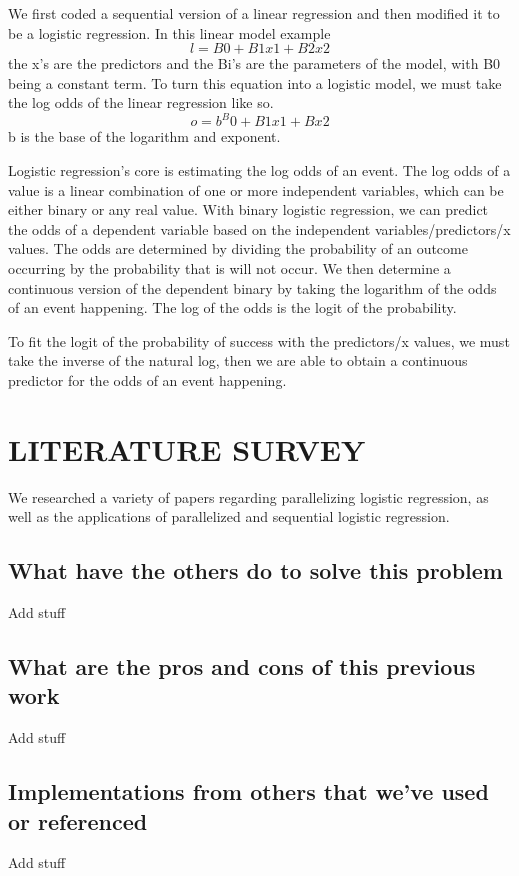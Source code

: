\documentclass[letterpaper, 10 pt, conference]{ieeeconf}  %
\begin{document}
We first coded a sequential version of a linear regression and then modified it to be a logistic regression. In this linear model example
$$l = B0 + B1x1 + B2x2$$
the x’s are the predictors and the Bi’s are the parameters of the model, with B0 being a constant term. To turn this equation into a logistic model, we must take the log odds of the linear regression like so.
$$o = b^ B0 + B1x1 + Bx2$$
b is the base of the logarithm and exponent. 


Logistic regression’s core is estimating the log odds of an event. The log odds of a value is a linear combination of one or more independent variables, which can be either binary or any real value. With binary logistic regression, we can predict the odds of a dependent variable based on the independent variables/predictors/x values. The odds are determined by dividing the probability of an outcome occurring by the probability that is will not occur. We then determine a continuous version of the dependent binary by taking the logarithm of the odds of an event happening. The log of the odds is the logit of the probability.

To fit the logit of the probability of success with the predictors/x values, we must take the inverse of the natural log, then we are able to obtain a continuous predictor for the odds of an event happening. 

\section{LITERATURE SURVEY}

We researched a variety of papers regarding parallelizing logistic regression, as well as the applications of parallelized and sequential logistic regression.

\subsection{What have the others do to solve this problem}
Add stuff

\subsection{What are the pros and cons of this previous work}
Add stuff

\subsection{Implementations from others that we’ve used or referenced} 
Add stuff
\end{document}
